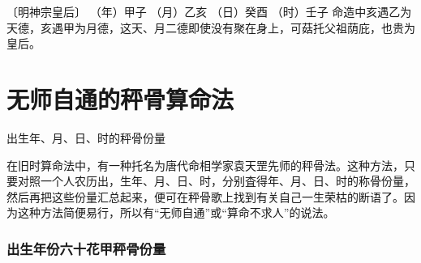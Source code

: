 \documentclass[a5paper,oneside,12pt]{ctexbook}
\begin{document}
{{〔明神宗皇后〕	
（年）甲子	
（月）乙亥	
（日）癸酉
（时）壬子
命造中亥遇乙为天德，亥遇甲为月德，这天、月二德即使没有聚在身上，可菇托父祖荫庇，也贵为皇后。

\section{无师自通的秤骨算命法}

出生年、月、日、时的秤骨份量

在旧时算命法中，有一种托名为唐代命相学家袁天罡先师的秤骨法。这种方法，只要对照一个人农历出，生年、月、日、时，分别査得年、月、日、时的称骨份量，然后再把这些份量汇总起来，便可在秤骨歌上找到有关自己一生荣枯的断语了。因为这种方法简便易行，所以有“无师自通”或“算命不求人”的说法。

\subsubsection{出生年份六十花甲秤骨份量}

}}
\end{document}
